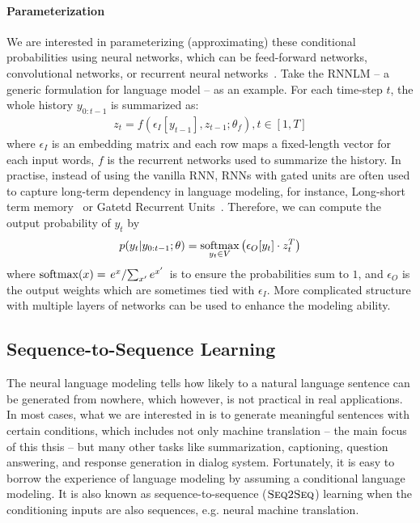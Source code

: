 \paragraph{Parameterization} 
We are interested in parameterizing (approximating) these conditional probabilities using neural networks, which can be feed-forward networks, convolutional networks, or recurrent neural networks~\citep[RNNLM, ][]{mikolov2010recurrent}. 
Take the RNNLM -- a generic formulation for language model -- as an example. For each time-step $t$, the whole history $y_{0: t-1}$ is summarized as:
\begin{equation}
    \begin{split}
         z_t = f(\epsilon_I[y_{t-1}], z_{t-1}; {\theta}_f) , t \in [1, T]
    \end{split}
\end{equation}
where $\epsilon_I$ is an embedding matrix and each row maps a fixed-length vector for each input words, $f$ is the recurrent networks used to summarize the history. In practise, instead of using the vanilla RNN, RNNs with gated units are often used to capture long-term dependency in language modeling, for instance, Long-short term memory~\citep[LSTM,][]{hochreiter1997long} or Gatetd Recurrent Units~\citep[GRU,][]{cho2014learning}.
Therefore, we can compute the output probability of $y_t$ by
\begin{equation}
    \label{cp2.eq.output}
    p(y_t|y_{0: t-1};\theta) = \mathop{\operatorname{\text{softmax}}}\limits_{y_t\in V}\left(\epsilon_O[y_t]\cdot z_t^T\right)
\end{equation}
where $\operatorname{\text{softmax}}(x) = \left. {e^x} \large / {\sum_{x'} e^{x'}} \right.$ is to ensure the probabilities sum to $1$, and $\epsilon_O$ is the output weights which are sometimes tied with $\epsilon_I$. More complicated structure with multiple layers of networks can be used to enhance the modeling ability.



\subsection{Sequence-to-Sequence Learning}
The neural language modeling tells how likely to a natural language sentence can be generated from nowhere, which however, is not practical in real applications. In most cases, what we are interested in is to generate meaningful sentences with certain conditions, which includes not only machine translation -- the main focus of this thsis -- but many other tasks like summarization, captioning, question answering, and response generation in dialog system. Fortunately, it is easy to borrow the experience of language modeling by assuming a conditional language modeling. 
It is also known as sequence-to-sequence (${{\textsc{Seq2Seq}}}$) learning when the conditioning inputs are also sequences, e.g. neural machine translation.

